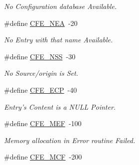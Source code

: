 \begin{DoxyCompactItemize}
\begin{DoxyCompactList}\small\item\em No Configuration database Available. \end{DoxyCompactList}\item 
\hypertarget{group__errors_ga7f7e54a5ccefa34556fe6da3b35b4f27}{\#define \hyperlink{group__errors_ga7f7e54a5ccefa34556fe6da3b35b4f27}{C\-F\-E\-\_\-\-N\-E\-A}~-\/20}\label{group__errors_ga7f7e54a5ccefa34556fe6da3b35b4f27}

\begin{DoxyCompactList}\small\item\em No Entry with that name Available. \end{DoxyCompactList}\item 
\hypertarget{group__errors_ga5db4a12696dff1db26958db1be075be9}{\#define \hyperlink{group__errors_ga5db4a12696dff1db26958db1be075be9}{C\-F\-E\-\_\-\-N\-S\-S}~-\/30}\label{group__errors_ga5db4a12696dff1db26958db1be075be9}

\begin{DoxyCompactList}\small\item\em No Source/origin is Set. \end{DoxyCompactList}\item 
\hypertarget{group__errors_gaaa38e8556d85b1bb41037b3bd022bc28}{\#define \hyperlink{group__errors_gaaa38e8556d85b1bb41037b3bd022bc28}{C\-F\-E\-\_\-\-E\-C\-P}~-\/40}\label{group__errors_gaaa38e8556d85b1bb41037b3bd022bc28}

\begin{DoxyCompactList}\small\item\em Entry's Content is a N\-U\-L\-L Pointer. \end{DoxyCompactList}\item 
\hypertarget{group__errors_ga46fb52baac2d4b91c5169a2918caff5d}{\#define \hyperlink{group__errors_ga46fb52baac2d4b91c5169a2918caff5d}{C\-F\-E\-\_\-\-M\-E\-F}~-\/100}\label{group__errors_ga46fb52baac2d4b91c5169a2918caff5d}

\begin{DoxyCompactList}\small\item\em Memory allocation in Error routine Failed. \end{DoxyCompactList}\item 
\hypertarget{group__errors_ga127dc37aea6ba5ef8d9dfe5cb9c629eb}{\#define \hyperlink{group__errors_ga127dc37aea6ba5ef8d9dfe5cb9c629eb}{C\-F\-E\-\_\-\-M\-C\-F}~-\/200}\label{group__errors_ga127dc37aea6ba5ef8d9dfe5cb9c629eb}


\end{DoxyCompactItemize}
